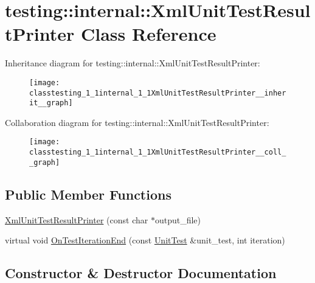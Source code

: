 \hypertarget{classtesting_1_1internal_1_1XmlUnitTestResultPrinter}{}\section{testing\+:\+:internal\+:\+:Xml\+Unit\+Test\+Result\+Printer Class Reference}
\label{classtesting_1_1internal_1_1XmlUnitTestResultPrinter}


Inheritance diagram for testing\+:\+:internal\+:\+:Xml\+Unit\+Test\+Result\+Printer\+:\nopagebreak
\begin{figure}[H]
\begin{center}
\leavevmode
\texttt{[image: classtesting\_1\_1internal\_1\_1XmlUnitTestResultPrinter\_\_inherit\_\_graph]}
\end{center}
\end{figure}


Collaboration diagram for testing\+:\+:internal\+:\+:Xml\+Unit\+Test\+Result\+Printer\+:\nopagebreak
\begin{figure}[H]
\begin{center}
\leavevmode
\texttt{[image: classtesting\_1\_1internal\_1\_1XmlUnitTestResultPrinter\_\_coll\_\_graph]}
\end{center}
\end{figure}
\subsection*{Public Member Functions}
\begin{DoxyCompactItemize}
\item 
\hyperlink{classtesting_1_1internal_1_1XmlUnitTestResultPrinter_afdaf88e6764c18ce0dcc3733d7a06e31}{Xml\+Unit\+Test\+Result\+Printer} (const char $\ast$output\+\_\+file)
\item 
virtual void \hyperlink{classtesting_1_1internal_1_1XmlUnitTestResultPrinter_a2ae986dd2f4f2aed31cc6f3bc8c56898}{On\+Test\+Iteration\+End} (const \hyperlink{classtesting_1_1UnitTest}{Unit\+Test} \&unit\+\_\+test, int iteration)
\end{DoxyCompactItemize}


\subsection{Constructor \& Destructor Documentation}
